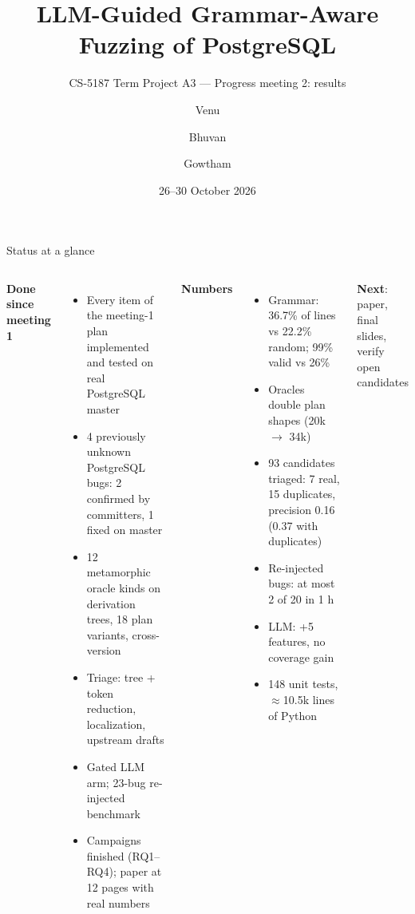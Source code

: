 \documentclass[aspectratio=169,11pt]{beamer}
\title{LLM-Guided Grammar-Aware Fuzzing of PostgreSQL}
\subtitle{CS-5187 Term Project A3 --- Progress meeting 2: results}
\author{Venu \and Bhuvan \and Gowtham}
\date{26--30 October 2026}
\newcommand{\pg}{PostgreSQL\xspace}
\begin{document}
\maketitle

\begin{frame}{Status at a glance}
\begin{columns}[T]
\textbf{Done since meeting 1}
\begin{itemize}\small
  \item Every item of the meeting-1 plan implemented and tested on real \pg master
  \item \alert{4 previously unknown \pg bugs}: 2 confirmed by committers, 1 fixed on master
  \item 12 metamorphic oracle kinds on derivation trees, 18 plan variants, cross-version
  \item Triage: tree + token reduction, localization, upstream drafts
  \item Gated LLM arm; 23-bug re-injected benchmark
  \item Campaigns finished (RQ1--RQ4); paper at 12 pages with real numbers
\end{itemize}
\textbf{Numbers}
\begin{itemize}\small
  \item Grammar: 36.7\% of lines vs 22.2\% random; 99\% valid vs 26\%
  \item Oracles double plan shapes (20k $\rightarrow$ 34k)
  \item 93 candidates triaged: 7 real, 15 duplicates, precision 0.16 (0.37 with duplicates)
  \item Re-injected bugs: at most 2 of 20 in 1 h
  \item LLM: +5 features, no coverage gain
  \item 148 unit tests, $\approx$10.5k lines of Python
\end{itemize}
\textbf{Next}: paper, final slides, verify open candidates
\end{columns}
\end{frame}
\end{document}
